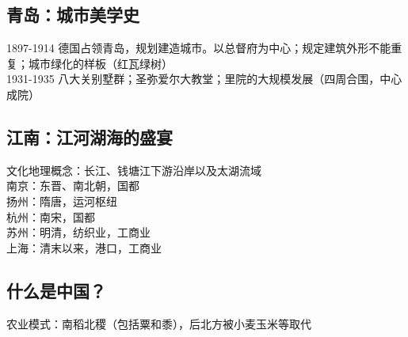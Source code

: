 \subsection*{青岛：城市美学史}

1897-1914 德国占领青岛，规划建造城市。以总督府为中心；规定建筑外形不能重复；城市绿化的样板（红瓦绿树）\\
1931-1935 八大关别墅群；圣弥爱尔大教堂；里院的大规模发展（四周合围，中心成院）

\subsection*{江南：江河湖海的盛宴}
文化地理概念：长江、钱塘江下游沿岸以及太湖流域\\
南京：东晋、南北朝，国都\\
扬州：隋唐，运河枢纽\\
杭州：南宋，国都\\
苏州：明清，纺织业，工商业\\
上海：清末以来，港口，工商业

\subsection*{什么是中国？}
农业模式：南稻北稷（包括粟和黍），后北方被小麦玉米等取代